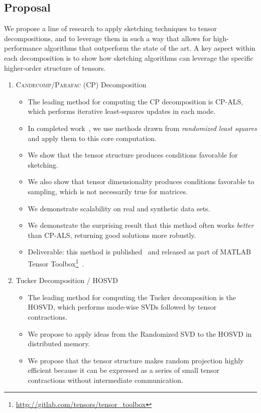 \subsection{Proposal}
We propose a line of research to apply sketching techniques to tensor decompositions, and to leverage them in such a way that allows for high-performance algorithms that outperform the state of the art. A key aspect within each decomposition is to show how sketching algorithms can leverage the specific higher-order structure of tensors.
\begin{enumerate}
\item \textsc{Candecomp/Parafac} (CP) Decomposition
\begin{itemize}
	\item The leading method for computing the CP decomposition is CP-ALS, which performs iterative least-squares updates in each mode.
	\item In completed work~\cite{caseyb}, we use methods drawn from \emph{randomized least squares} and apply them to this core computation.
	\item We show that the tensor structure produces conditions favorable for sketching.
	\item We also show that tensor dimensionality produces conditions favorable to sampling, which is not necessarily true for matrices.
	\item We demonstrate scalability on real and synthetic data sets.
	\item We demonstrate the surprising result that this method often works \emph{better} than CP-ALS, returning good solutions more robustly.
	\item Deliverable: this method is published~\cite{caseyb} and released as part of MATLAB Tensor Toolbox\footnote{\url{http://gitlab.com/tensors/tensor_toolbox}}~\cite{TTB_Software}.
\end{itemize}
\item Tucker Decomposition / HOSVD
\begin{itemize}
	\item The leading method for computing the Tucker decomposition is the HOSVD, which performs mode-wise SVDs followed by tensor contractions.
	\item We propose to apply ideas from the Randomized SVD to the HOSVD in distributed memory.
	\item We propose that the tensor structure makes random projection highly efficient because it can be expressed as a series of small tensor contractions without intermediate communication. 

\end{itemize}
\end{enumerate}
